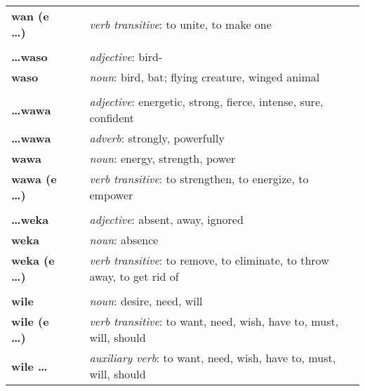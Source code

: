 \begin{supertabular}{p{2,5cm}|ll}
\textbf{wan (e \dots)} && \textit{verb transitive}: to unite, to make one \\ 
 && \\ %
\textbf{\dots waso} && \textit{adjective}: bird- \\ 
\textbf{waso} && \textit{noun}: bird, bat; flying creature, winged animal \\ 
 && \\ %
\textbf{\dots wawa} && \textit{adjective}: energetic, strong, fierce, intense, sure, confident \\ 
\textbf{\dots wawa} && \textit{adverb}: strongly, powerfully \\ 
\textbf{wawa} && \textit{noun}: energy, strength, power \\ 
\textbf{wawa (e \dots)} && \textit{verb transitive}: to strengthen, to energize, to empower \\ 
 && \\ %
\textbf{\dots weka} && \textit{adjective}: absent, away, ignored \\ 
\textbf{weka} && \textit{noun}: absence \\ 
\textbf{weka (e \dots)} && \textit{verb transitive}: to remove, to eliminate, to throw away, to get rid of \\ 
 && \\ %
\textbf{wile} && \textit{noun}: desire, need, will \\ 
\textbf{wile (e \dots)} && \textit{verb transitive}: to want, need, wish, have to, must, will, should \\ 
\textbf{wile \dots} && \textit{auxiliary verb}: to want, need, wish, have to, must, will, should \\ 
\end{supertabular} \\
%
